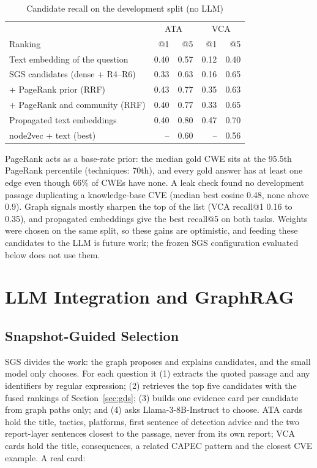 \documentclass[conference]{IEEEtran}
\begin{document}
\begin{table}[t]
\caption{Candidate recall on the development split (no LLM)}
\label{tab:signals}
\centering
\footnotesize
\begin{tabular}{@{}l r r r r@{}}
\toprule
& \multicolumn{2}{c}{ATA} & \multicolumn{2}{c}{VCA} \\
Ranking & @1 & @5 & @1 & @5 \\
\midrule
Text embedding of the question & 0.40 & 0.57 & 0.12 & 0.40 \\
SGS candidates (dense + R4--R6) & 0.33 & 0.63 & 0.16 & 0.65 \\
\quad + PageRank prior (RRF) & 0.43 & 0.77 & 0.35 & 0.63 \\
\quad + PageRank and community (RRF) & 0.40 & 0.77 & 0.33 & 0.65 \\
Propagated text embeddings & 0.40 & 0.80 & 0.47 & 0.70 \\
node2vec + text (best) & -- & 0.60 & -- & 0.56 \\
\bottomrule
\end{tabular}
\end{table}

PageRank acts as a base-rate prior: the median gold CWE sits at the 95.5th PageRank percentile (techniques: 70th), and every gold answer has at least one edge even though 66\% of CWEs have none. A leak check found no development passage duplicating a knowledge-base CVE (median best cosine 0.48, none above 0.9). Graph signals mostly sharpen the top of the list (VCA recall@1 0.16 to 0.35), and propagated embeddings give the best recall@5 on both tasks. Weights were chosen on the same split, so these gains are optimistic, and feeding these candidates to the LLM is future work; the frozen SGS configuration evaluated below does not use them.

\section{LLM Integration and GraphRAG}\label{sec:graphrag}

\subsection{Snapshot-Guided Selection}

SGS divides the work: the graph proposes and explains candidates, and the small model only chooses. For each question it (1) extracts the quoted passage and any identifiers by regular expression; (2) retrieves the top five candidates with the fused rankings of Section~\ref{sec:gds}; (3) builds one evidence card per candidate from graph paths only; and (4) asks Llama-3-8B-Instruct to choose. ATA cards hold the title, tactics, platforms, first sentence of detection advice and the two report-layer sentences closest to the passage, never from its own report; VCA cards hold the title, consequences, a related CAPEC pattern and the closest CVE example. A real card:
\end{document}
